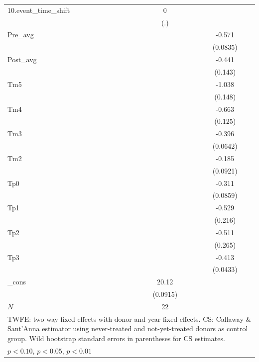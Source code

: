 \begin{table}[htbp]
\begin{tabular}{l*{2}{c}}
\addlinespace
10.event\_time\_shift&           0         &                     \\
            &         (.)         &                     \\
\addlinespace
Pre\_avg     &                     &      -0.571\sym{***}\\
            &                     &    (0.0835)         \\
\addlinespace
Post\_avg    &                     &      -0.441\sym{***}\\
            &                     &     (0.143)         \\
\addlinespace
Tm5         &                     &      -1.038\sym{***}\\
            &                     &     (0.148)         \\
\addlinespace
Tm4         &                     &      -0.663\sym{***}\\
            &                     &     (0.125)         \\
\addlinespace
Tm3         &                     &      -0.396\sym{***}\\
            &                     &    (0.0642)         \\
\addlinespace
Tm2         &                     &      -0.185\sym{**} \\
            &                     &    (0.0921)         \\
\addlinespace
Tp0         &                     &      -0.311\sym{***}\\
            &                     &    (0.0859)         \\
\addlinespace
Tp1         &                     &      -0.529\sym{**} \\
            &                     &     (0.216)         \\
\addlinespace
Tp2         &                     &      -0.511\sym{*}  \\
            &                     &     (0.265)         \\
\addlinespace
Tp3         &                     &      -0.413\sym{***}\\
            &                     &    (0.0433)         \\
\addlinespace
\_cons      &       20.12\sym{***}&                     \\
            &    (0.0915)         &                     \\
\midrule
\(N\)       &          22         &                     \\
\bottomrule
\multicolumn{3}{l}{\footnotesize TWFE: two-way fixed effects with donor and year fixed effects. CS: Callaway \& Sant'Anna estimator using never-treated and not-yet-treated donors as control group. Wild bootstrap standard errors in parentheses for CS estimates.}\\
\multicolumn{3}{l}{\footnotesize \sym{*} \(p<0.10\), \sym{**} \(p<0.05\), \sym{***} \(p<0.01\)}\\
\end{tabular}
\end{table}

